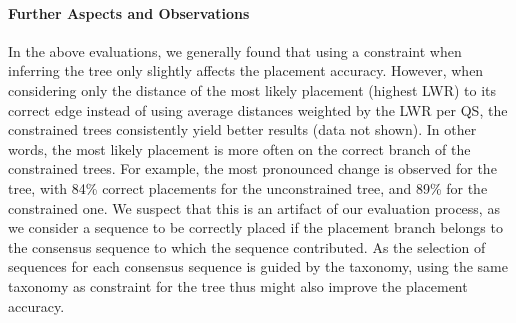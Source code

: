 \paragraph{Further Aspects and Observations}
\label{ch:AutomaticTrees:sec:Evaluation:sub:Accuracy:par:FurtherAspectsAndObservations}

In the above evaluations, we generally found that using a constraint
when inferring the tree only slightly affects the placement accuracy.
However, when considering only the distance of the most likely placement (highest \ac{LWR}) to its correct edge
instead of using average distances weighted by the \ac{LWR} per \ac{QS},
the constrained trees consistently yield better results (data not shown).
In other words, the most likely placement is more often on the correct branch of the constrained trees.
For example, the most pronounced change is observed for the  tree,
with 84\% correct placements for the unconstrained tree, and 89\% for the constrained one.
We suspect that this is an artifact of our evaluation process,
as we consider a sequence to be correctly placed if the placement branch belongs to the consensus sequence
to which the sequence contributed.
As the selection of sequences for each consensus sequence is guided by the taxonomy,
using the same taxonomy as constraint for the tree thus might also improve the placement accuracy.

